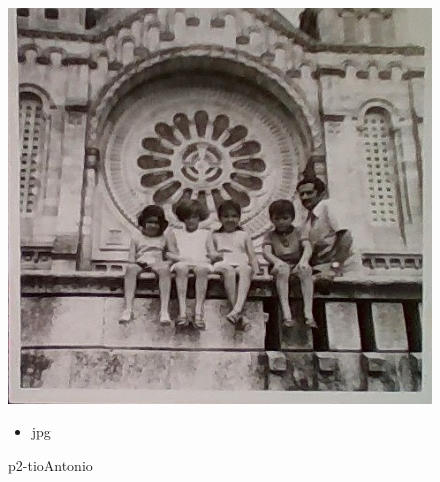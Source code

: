 \documentclass{article}
\begin{document}
		\begin{figure}[ht!]
		\begin{minipage}{0.35\textwidth}
			\centering
			\includegraphics[width=\linewidth]{ManuelVilar/ClaraVilar/p2-tioAntonio.jpg}
			\caption{ p2-tioAntonio }
		\end{minipage}
		\hspace{1cm} %
		\begin{minipage}{0.3\textwidth}
			\begin{tcolorbox}[colback=white, colframe=black, boxrule=1pt]
				\begin{itemize}
					\item jpg
                    
				\end{itemize}

			\end{tcolorbox}
		\end{minipage}
	\end{figure}
	
\end{document}
